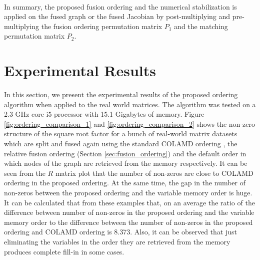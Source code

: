\paragraph{}
In summary, the proposed fusion ordering and the numerical stabilization is applied on the fused graph or the fused Jacobian by post-multiplying and pre-multiplying the fusion ordering permutation matrix $P_1$ and the matching permutation matrix $P_2$.

\section{Experimental Results}
In this section, we present the experimental results of the proposed ordering algorithm when applied to the real world matrices. The algorithm was tested on a 2.3 GHz core i5 processor with 15.1 Gigabytes of memory. Figure \ref{fig:ordering_comparison_1} and \ref{fig:ordering_comparison_2} shows the non-zero structure of the square root factor for a bunch of real-world matrix datasets which are split and fused again using the standard COLAMD ordering \cite{colamd}, the relative fusion ordering (Section \ref{sec:fusion_ordering}) and the default order in which nodes of the graph are retrieved from the memory respectively. It can be seen from the $R$ matrix plot that the number of non-zeros are close to COLAMD ordering in the proposed ordering. At the same time, the gap in the number of non-zeros between the proposed ordering and the variable memory order is huge. It can be calculated that from these examples that, on an average the ratio of the difference between number of non-zeros in the proposed ordering and the variable memory order to the difference between the number of non-zeros in the proposed ordering and COLAMD ordering is 8.373. Also, it can be observed that just eliminating the variables in the order they are retrieved from the memory produces complete fill-in in some cases. 
